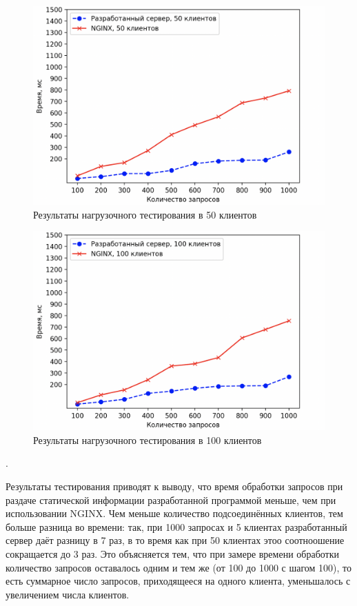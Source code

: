 \clearpage
\begin{figure}[h]
	\centering
	\captionsetup{justification=centering}
	\includegraphics[width=120mm]{img/50.png}
	\caption{Результаты нагрузочного тестирования в 50 клиентов}
	\label{fig:test-50}
\end{figure}

\begin{figure}[h]
	\centering
	\captionsetup{justification=centering}
	\includegraphics[width=120mm]{img/100.png}
	\caption{Результаты нагрузочного тестирования в 100 клиентов}
	\label{fig:test-100}
\end{figure}.
\clearpage

Результаты тестирования приводят к выводу, что время обработки запросов при раздаче статической информации разработанной программой меньше, чем при использовании NGINX. Чем меньше количество подсоединённых клиентов, тем больше разница во времени: так, при 1000 запросах и 5 клиентах разработанный сервер даёт разницу в 7 раз, в то время как при 50 клиентах этоо соотноошение сокращается до 3 раз. Это объясняется тем, что при замере времени обработки количество запросов оставалось одним и тем же (от 100 до 1000 с шагом 100), то есть суммарное число запросов, приходящееся на одного клиента, уменьшалось с увеличением числа клиентов.


